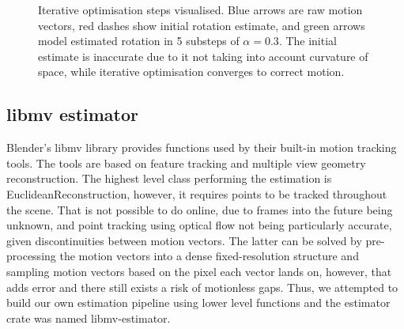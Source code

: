 \documentclass[11pt,english]{report}
\begin{document}
\begin{figure}[!ht]
	\centering
	\caption{\centering Iterative optimisation steps visualised. Blue arrows are raw motion vectors, red dashes show initial rotation estimate, and green arrows model estimated rotation in 5 substeps of $\alpha = 0.3$. The initial estimate is inaccurate due to it not taking into account curvature of space, while iterative optimisation converges to correct motion.}
\end{figure}

\subsection{libmv estimator}

Blender's libmv library provides functions used by their built-in motion tracking tools\cite{blender-motion-tracking}. The tools are based on feature tracking and multiple view geometry reconstruction. The highest level class performing the estimation is EuclideanReconstruction, however, it requires points to be tracked throughout the scene. That is not possible to do online, due to frames into the future being unknown, and point tracking using optical flow not being particularly accurate, given discontinuities between motion vectors. The latter can be solved by pre-processing the motion vectors into a dense fixed-resolution structure and sampling motion vectors based on the pixel each vector lands on, however, that adds error and there still exists a risk of motionless gaps. Thus, we attempted to build our own estimation pipeline using lower level functions and the estimator crate was named libmv-estimator.
\end{document}
